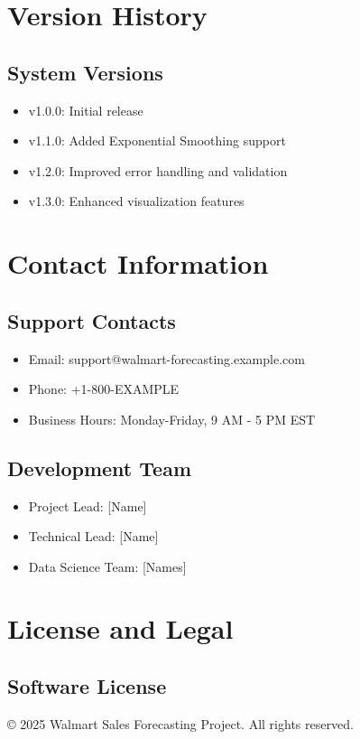 \section{Version History}

\subsection{System Versions}
\begin{itemize}
	\item v1.0.0: Initial release
	\item v1.1.0: Added Exponential Smoothing support
	\item v1.2.0: Improved error handling and validation
	\item v1.3.0: Enhanced visualization features
\end{itemize}

\section{Contact Information}

\subsection{Support Contacts}
\begin{itemize}
	\item Email: support@walmart-forecasting.example.com
	\item Phone: +1-800-EXAMPLE
	\item Business Hours: Monday-Friday, 9 AM - 5 PM EST
\end{itemize}

\subsection{Development Team}
\begin{itemize}
	\item Project Lead: [Name]
	\item Technical Lead: [Name]
	\item Data Science Team: [Names]
\end{itemize}

\section{License and Legal}

\subsection{Software License}
© 2025 Walmart Sales Forecasting Project. All rights reserved.

